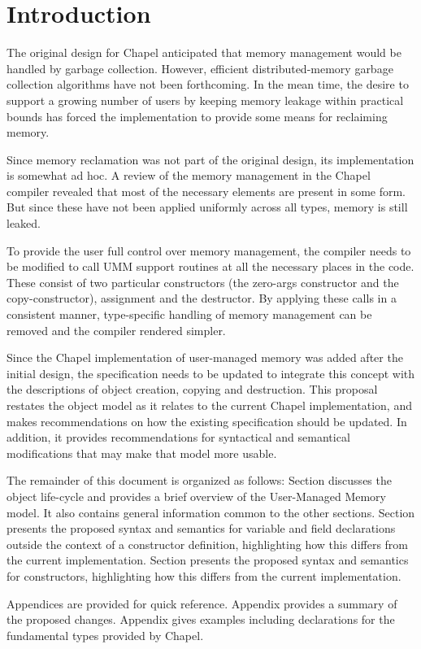 \section{Introduction}

The original design for Chapel anticipated that memory management would be handled
by garbage collection.  However, efficient distributed-memory garbage collection
algorithms have not been forthcoming.  In the mean time, the desire to support a growing
number of users by keeping memory leakage within practical bounds has forced the
implementation to provide some means for reclaiming memory.  

Since memory reclamation was not part of the original design, its implementation is somewhat
ad hoc.  A review of the memory management in the Chapel compiler revealed
that most of the necessary elements are present in some form.  But since these have not
been applied uniformly across all types, memory is still leaked.

To provide the user full control over memory management, the compiler needs to be modified
to call UMM support routines at all the necessary places in the code.  These consist
of two particular constructors (the zero-args constructor and the copy-constructor),
assignment and the destructor.  By applying these calls in a consistent
manner, type-specific handling of memory management can be removed and the compiler
rendered simpler.

Since the Chapel implementation of user-managed memory was added after the initial design,
the specification needs to be updated to integrate this concept with the descriptions of
object creation, copying and destruction.  This proposal restates the object
model as it relates to the current Chapel implementation, and makes recommendations on how
the existing specification should be updated.  In addition, it provides recommendations for
syntactical and semantical modifications that may make that model more usable.

The remainder of this document is organized as follows: Section  discusses
the object life-cycle and provides a brief overview of the User-Managed Memory model.  It
also contains general information common to the other sections.  Section
 presents the proposed syntax and semantics for variable and field
declarations outside the context of a constructor definition, highlighting how this
differs from the current implementation.  Section  presents the
proposed syntax and semantics for constructors, highlighting how this differs from the
current implementation.

Appendices are provided for quick reference.  Appendix  provides a summary of the
proposed changes.  Appendix  gives examples including declarations for the
fundamental types provided by Chapel.

